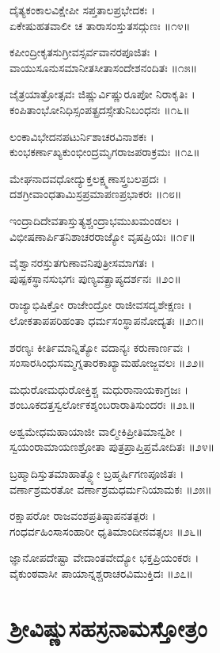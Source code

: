ದೈತ್ಯಕಂಕಾಲವಿಕ್ಷೇಪೀ ಸಪ್ತತಾಲಪ್ರಭೇದಕಃ ।\\
ಏಕೇಷುಹತವಾಲೀ ಚ ತಾರಾಸಂಸ್ತುತಸದ್ಗುಣಃ ॥೧೪॥

ಕಪೀಂದ್ರೀಕೃತಸುಗ್ರೀವಸ್ಸರ್ವವಾನರಪೂಜಿತಃ ।\\
ವಾಯುಸೂನುಸಮಾನೀತಸೀತಾಸಂದೇಶನಂದಿತಃ ॥೧೫॥

ಜೈತ್ರಯಾತ್ರೋತ್ಸವಃ ಜಿಷ್ಣುರ್ವಿಷ್ಣುರೂಪೋ ನಿರಾಕೃತಿಃ ।\\
ಕಂಪಿತಾಂಭೋನಿಧಿಸ್ಸಂಪತ್ಪ್ರದಸ್ಸೇತುನಿಬಂಧನಃ ॥೧೬॥

ಲಂಕಾವಿಭೇದನಪಟುರ್ನಿಶಾಚರವಿನಾಶಕಃ ।\\
ಕುಂಭಕರ್ಣಾಖ್ಯಕುಂಭೀಂದ್ರಮೃಗರಾಜಪರಾಕ್ರಮಃ ॥೧೭॥

ಮೇಘನಾದವಧೋದ್ಯುಕ್ತಲಕ್ಷ್ಮಣಾಸ್ತ್ರಬಲಪ್ರದಃ ।\\
ದಶಗ್ರೀವಾಂಧತಾಮಿಸ್ರಪ್ರಮಾಪಣಪ್ರಭಾಕರಃ ॥೧೮॥

ಇಂದ್ರಾದಿದೇವತಾಸ್ತುತ್ಯಶ್ಚಂದ್ರಾಭಮುಖಮಂಡಲಃ ।\\
ವಿಭೀಷಣಾರ್ಪಿತನಿಶಾಚರರಾಜ್ಯೋ ವೃಷಪ್ರಿಯಃ ॥೧೯॥

ವೈಶ್ವಾನರಸ್ತುತಗುಣಾವನಿಪುತ್ರೀಸಮಾಗತಃ ।\\
ಪುಷ್ಪಕಸ್ಥಾನಸುಭಗಃ ಪುಣ್ಯವತ್ಪ್ರಾಪ್ಯದರ್ಶನಃ ॥೨೦॥

ರಾಜ್ಯಾಭಿಷಿಕ್ತೋ ರಾಜೇಂದ್ರೋ ರಾಜೀವಸದೃಶೇಕ್ಷಣಃ ।\\
ಲೋಕತಾಪಪರಿಹಂತಾ ಧರ್ಮಸಂಸ್ಥಾಪನೋದ್ಯತಃ ॥೨೧॥

ಶರಣ್ಯಃ ಕೀರ್ತಿಮಾನ್ನಿತ್ಯೋ ವದಾನ್ಯಃ ಕರುಣಾರ್ಣವಃ ।\\
ಸಂಸಾರಸಿಂಧುಸಮ್ಮಗ್ನತಾರಕಾಖ್ಯಾಮಹೋಜ್ಜವಲಃ ॥೨೨॥

ಮಧುರೋಮಧುರೋಕ್ತಿಶ್ಚ ಮಧುರಾನಾಯಕಾಗ್ರಜಃ ।\\
ಶಂಬೂಕದತ್ತಸ್ವರ್ಲೋಕಶ್ಶಂಬರಾರಾತಿಸುಂದರಃ ॥೨೩॥

ಅಶ್ವಮೇಧಮಹಾಯಾಜೀ ವಾಲ್ಮೀಕಿಪ್ರೀತಿಮಾನ್ವಶೀ ।\\
ಸ್ವಯಂರಾಮಾಯಣಶ್ರೋತಾ ಪುತ್ರಪ್ರಾಪ್ತಿಪ್ರಮೋದಿತಃ ॥೨೪॥

ಬ್ರಹ್ಮಾದಿಸ್ತುತಮಾಹಾತ್ಮ್ಯೋ ಬ್ರಹ್ಮರ್ಷಿಗಣಪೂಜಿತಃ ।\\
ವರ್ಣಾಶ್ರಮರತೋ ವರ್ಣಾಶ್ರಮಧರ್ಮನಿಯಾಮಕಃ ॥೨೫॥

ರಕ್ಷಾಪರೋ ರಾಜವಂಶಪ್ರತಿಷ್ಠಾಪನತತ್ಪರಃ ।\\
ಗಂಧರ್ವಹಿಂಸಾಸಂಹಾರೀ ಧೃತಿಮಾಂದೀನವತ್ಸಲಃ ॥೨೬॥

ಜ್ಞಾನೋಪದೇಷ್ಟಾ ವೇದಾಂತವೇದ್ಯೋ ಭಕ್ತಪ್ರಿಯಂಕರಃ ।\\
ವೈಕುಂಠವಾಸೀ ಪಾಯಾನ್ನಶ್ಚರಾಚರವಿಮುಕ್ತಿದಃ ॥೨೭॥

\section{ಶ್ರೀವಿಷ್ಣುಸಹಸ್ರನಾಮಸ್ತೋತ್ರಂ}


